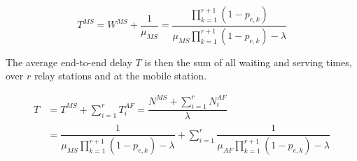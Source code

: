 \begin{equation}
  T^{MS} = W^{MS} + \dfrac{1}{\mu_{MS}} =
  \dfrac{\prod\limits_{k=1}^{r+1} (1 - p_{e,k})}{\mu_{MS}\prod\limits_{k=1}^{r+1} (1 - p_{e,k}) -\lambda}
  \label{eq:01_10}
\end{equation}

The average end-to-end delay $T$ is then the sum of all waiting and serving times,
over $r$ relay stations and at the mobile station.

\begin{align*}
  T &= T^{MS} + \sum\limits_{i=1}^r T_i^{AF} = \dfrac{N^{MS} + \sum\limits_{i=1}^r N_i^{AF}}{\lambda} \\
  ~ &= \dfrac{1}{\mu_{MS}\prod\limits_{k=1}^{r+1} (1 - p_{e,k}) - \lambda} +
  \sum\limits_{i=1}^r \dfrac{1}{\mu_{AF}\prod\limits_{k=1}^{r+1} (1 - p_{e,k}) - \lambda}
\end{align*}
